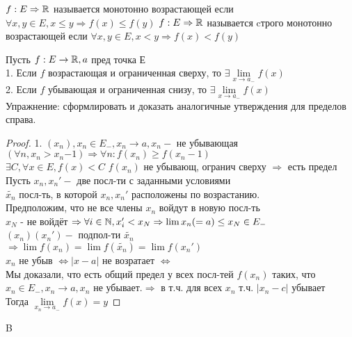 \begin{definition}
	 $ f : E \Rightarrow \mathbb{R} $ называется монотонно возрастающей если $ \forall x, y \in E, x \leq y \Rightarrow f(x) \leq f(y)$
	 $ f : E \Rightarrow \mathbb{R} $ называется cтрого монотонно возрастающей если $ \forall x, y \in E, x < y \Rightarrow f(x) < f(y)$
\end{definition}

Пусть $ f : E \rightarrow \mathbb{R}, a $ пред точка Е\\
1. Если $ f $ возрастающая и ограниченная сверху, то $ \exists \lim\limits_{x \rightarrow a_- } f(x) $ \\
2. Если $ f $ убывающая и ограниченная снизу, то $ \exists \lim\limits_{x \rightarrow a_- } f(x) $ \\
Упражнение: сформлировать и доказать аналогичные утверждения для пределов справа.
\begin{proof}
	1. $ (x_n), x_n \in E_-, x_n \rightarrow a, x_n - $ не убывающая $ (\forall n, x_n > x_n{-1}) \Rightarrow \forall n : f(x_n) \geq f(x_n-1) $\\
	$ \exists C, \forall x \in E, f(x) < C$
	$ f(x_n) $ не убывающ, огранич сверху $ \Rightarrow$ есть предел\\
	Пусть $ x_n, x_n' - $ две посл-ти с заданными условиями \\
	$ \widetilde{x_n} $ посл-ть, в которой $ x_n, x_n' $ расположены по возрастанию.\\
	Предположим, что не все члены $ x_n $ войдут в новую посл-ть \\
	$ x_N $ - не войдёт $ \Rightarrow \forall i \in \mathbb{N}, x_i' < x_N \Rightarrow \lim x_n (=a) \leq x_N \in E_- $\\
	$ (x_n)(x_n') - $ подпол-ти $ \widetilde{x_n} $\\
	$ \Rightarrow \lim f(x_n) = \lim f(\widetilde{x_n}) = \lim f(x_n') $ \\
	$x_n $ не убыв $\Leftrightarrow |x-a| $ не возратает $ \Leftrightarrow$\\
	Мы доказали, что есть общий предел у всех посл-тей $ f(x_n) $ таких, что $ x_n \in E_-, x_n \rightarrow a, x_n $ не убывает.$ \Rightarrow $ в т.ч. для всех $ x_n $ т.ч. $ |x_n - c| $ убывает \\	
	Тогда $ \lim\limits_{x_n \rightarrow a_-} f(x) = y $
 \end{proof}

B

